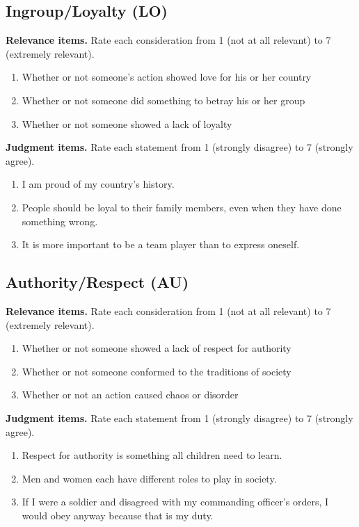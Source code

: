 \documentclass[11pt]{article}
\begin{document}
\subsection*{Ingroup/Loyalty (LO)}
\textbf{Relevance items.} Rate each consideration from 1 (not at all relevant) to 7 (extremely relevant).
\begin{enumerate}
\item[LO13] Whether or not someone's action showed love for his or her country
\item[LO14] Whether or not someone did something to betray his or her group
\item[LO15] Whether or not someone showed a lack of loyalty
\end{enumerate}
\textbf{Judgment items.} Rate each statement from 1 (strongly disagree) to 7 (strongly agree).
\begin{enumerate}
\item[LO16] I am proud of my country's history.
\item[LO17] People should be loyal to their family members, even when they have done something wrong.
\item[LO18] It is more important to be a team player than to express oneself.
\end{enumerate}
\subsection*{Authority/Respect (AU)}
\textbf{Relevance items.} Rate each consideration from 1 (not at all relevant) to 7 (extremely relevant).
\begin{enumerate}
\item[AU19] Whether or not someone showed a lack of respect for authority
\item[AU20] Whether or not someone conformed to the traditions of society
\item[AU21] Whether or not an action caused chaos or disorder
\end{enumerate}
\textbf{Judgment items.} Rate each statement from 1 (strongly disagree) to 7 (strongly agree).
\begin{enumerate}
\item[AU22] Respect for authority is something all children need to learn.
\item[AU23] Men and women each have different roles to play in society.
\item[AU24] If I were a soldier and disagreed with my commanding officer's orders, I would obey anyway because that is my duty.
\end{enumerate}
\end{document}
